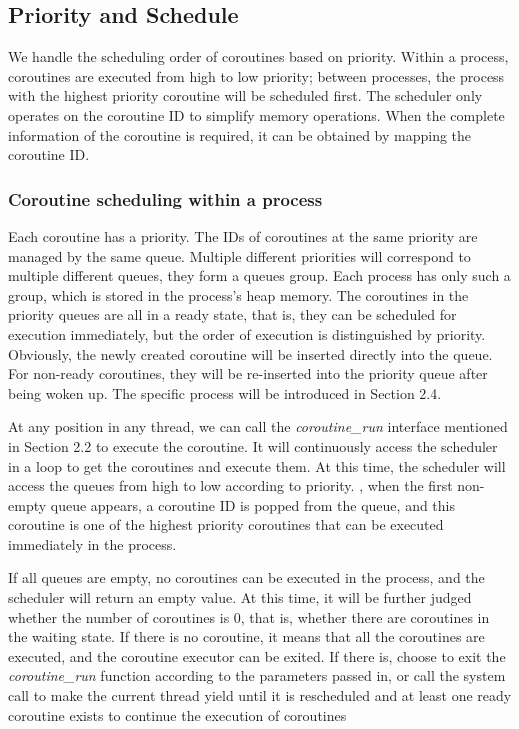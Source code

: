 \documentclass[10pt]{article}
\begin{document}
\subsection{Priority and Schedule}

We handle the scheduling order of coroutines based on priority. Within a process, coroutines are executed from high to low priority; between processes, the process with the highest priority coroutine will be scheduled first. The scheduler only operates on the coroutine ID to simplify memory operations. When the complete information of the coroutine is required, it can be obtained by mapping the coroutine ID.


\subsubsection{Coroutine scheduling within a process}

Each coroutine has a priority. The IDs of coroutines at the same priority are managed by the same queue. Multiple different priorities will correspond to multiple different queues, they form a queues group. Each process has only such a group, which is stored in the process's heap memory. The coroutines in the priority queues are all in a ready state, that is, they can be scheduled for execution immediately, but the order of execution is distinguished by priority. Obviously, the newly created coroutine will be inserted directly into the queue. For non-ready coroutines, they will be re-inserted into the priority queue after being woken up. The specific process will be introduced in Section 2.4.

At any position in any thread, we can call the \textit{coroutine\_run} interface mentioned in Section 2.2 to execute the coroutine. It will continuously access the scheduler in a loop to get the coroutines and execute them. At this time, the scheduler will access the queues from high to low according to priority. , when the first non-empty queue appears, a coroutine ID is popped from the queue, and this coroutine is one of the highest priority coroutines that can be executed immediately in the process.

If all queues are empty, no coroutines can be executed in the process, and the scheduler will return an empty value. At this time, it will be further judged whether the number of coroutines is 0, that is, whether there are coroutines in the waiting state. If there is no coroutine, it means that all the coroutines are executed, and the coroutine executor can be exited. If there is, choose to exit the \textit{coroutine\_run} function according to the parameters passed in, or call the system call to make the current thread yield until it is rescheduled and at least one ready coroutine exists to continue the execution of coroutines
\end{document}
